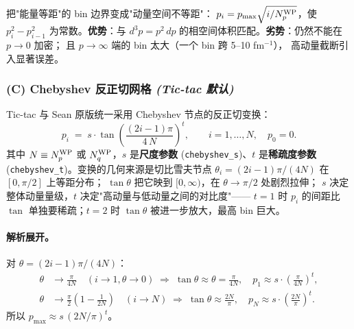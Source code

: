 把"能量等距"的 bin 边界变成"动量空间不等距"：
\(p_i = p_{\max} \sqrt{i / {N_{p}^{\text{WP}}}}\)，使
\(p_i^2 - p_{i-1}^2\) 为常数。\textbf{优势}：与
\(d^3p = p^2\,dp\) 的相空间体积匹配。\textbf{劣势}：仍然不能在
\(p \to 0\) 加密；
且 \(p \to \infty\) 端的 bin 太大（一个 bin 跨 5--10 fm\(^{-1}\)），
高动量截断引入显著误差。

\subsubsection{(C) Chebyshev 反正切网格 \emph{(Tic-tac 默认)}}
\label{sssec:ch05-cheb-grid}

Tic-tac 与 Sean 原版统一采用 Chebyshev 节点的反正切变换：
\begin{equation}
\label{eq:ch05-cheb-edges}
\boxed{
p_i \;=\; s \cdot \tan\!\left( \frac{(2i - 1)\pi}{4\,N} \right)^{t},
\qquad i = 1, \ldots, N,
\quad p_0 = 0.
}
\end{equation}
其中 \(N \equiv {N_{p}^{\text{WP}}}\) 或 \({N_{q}^{\text{WP}}}\)，\(s\) 是\textbf{尺度参数}
(\texttt{chebyshev\_s})、\(t\) 是\textbf{稀疏度参数}
(\texttt{chebyshev\_t})。变换的几何来源是切比雪夫节点
\(\theta_i = (2i - 1)\pi / (4N)\) 在 \([0, \pi/2]\) 上等距分布；
\(\tan\theta\) 把它映到 \([0, \infty)\)，在 \(\theta \to \pi/2\) 处剧烈拉伸；
\(s\) 决定整体动量量级，\(t\) 决定"高动量与低动量之间的对比度"——
\(t = 1\) 时 \(p_i\) 的间距比 \(\tan\) 单独要稀疏；\(t = 2\) 时
\(\tan\theta\) 被进一步放大，最高 bin 巨大。

\paragraph{解析展开。}
对 \(\theta = (2i - 1)\pi / (4N)\)：
\begin{align}
\theta &\to \frac{\pi}{4N} \quad (i \to 1, \theta \to 0)
       \;\Rightarrow\;
       \tan\theta \approx \theta = \frac{\pi}{4N},
       \quad
       p_1 \approx s \cdot \left(\frac{\pi}{4N}\right)^t,\\
\theta &\to \frac{\pi}{2}\!\left(1 - \frac{1}{2N}\right)
       \quad (i \to N)
       \;\Rightarrow\;
       \tan\theta \approx \frac{2N}{\pi},
       \quad
       p_N \approx s \cdot \left(\frac{2N}{\pi}\right)^t.
\end{align}
所以 \(p_{\max} \approx s\,(2N/\pi)^t\)。

